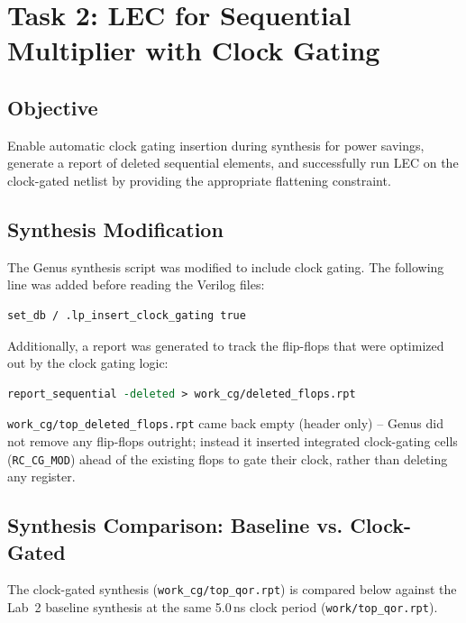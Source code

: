 \documentclass[12pt,a4paper]{article}
\begin{document}

\section*{Task 2: LEC for Sequential Multiplier with Clock Gating}
\subsection*{Objective}
Enable automatic clock gating insertion during synthesis for power savings, generate a report of deleted sequential elements, and successfully run LEC on the clock-gated netlist by providing the appropriate flattening constraint.

\subsection*{Synthesis Modification}
The Genus synthesis script was modified to include clock gating. The following line was added before reading the Verilog files:
\begin{lstlisting}[language=Tcl]
set_db / .lp_insert_clock_gating true
\end{lstlisting}
Additionally, a report was generated to track the flip-flops that were optimized out by the clock gating logic:
\begin{lstlisting}[language=Tcl]
report_sequential -deleted > work_cg/deleted_flops.rpt
\end{lstlisting}
\texttt{work\_cg/top\_deleted\_flops.rpt} came back empty (header only) -- Genus did not remove any
flip-flops outright; instead it inserted integrated clock-gating cells (\texttt{RC\_CG\_MOD}) ahead
of the existing flops to gate their clock, rather than deleting any register.

\subsection*{Synthesis Comparison: Baseline vs. Clock-Gated}
The clock-gated synthesis (\texttt{work\_cg/top\_qor.rpt}) is compared below against the Lab~2
baseline synthesis at the same 5.0\,ns clock period (\texttt{work/top\_qor.rpt}).
\end{document}
